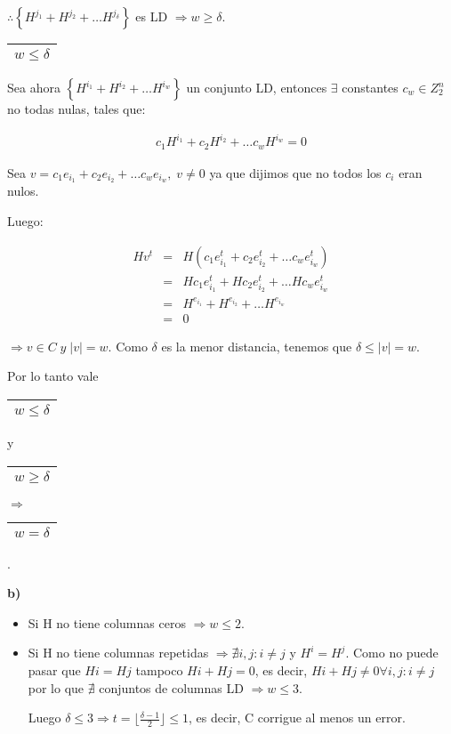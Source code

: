 \documentclass[12pt,a4paper]{report}
\newcounter{neq}
\begin{document}
		$\therefore \left\lbrace H^{j_{1}} + H^{j_{2}} + \dotsc H^{j_{\delta}} \right\rbrace$ es LD $\Rightarrow w \geq \delta$.

		\vspace{3mm}
		\begin{tabular}{|c|} \hline $w \leq \delta $ \\ \hline \end{tabular} Sea ahora $\left\lbrace H^{i_{1}} + H^{i_{2}} + \dotsc H^{i_{w}} \right\rbrace$ un conjunto LD, entonces $\exists$ constantes $c_{w} \in Z_{2}^{n}$ no todas nulas, tales que:

		\begin{eqnarray}
			\nonumber c_{1} H^{i_{1}} + c_{2} H^{i_{2}} + \dotsc c_{w} H^{i_{w}} = 0
		\end{eqnarray}

		Sea $v = c_{1} e_{i_{1}} + c_{2} e_{i_{2}} + \dotsc c_{w} e_{i_{w}} , \; v \neq 0$ ya que dijimos que no todos los $c_{i}$ eran nulos.

		Luego:

		\begin{eqnarray}
			\nonumber H v^{t} &=& H (c_{1} e_{i_{1}}^{t} + c_{2} e_{i_{2}}^{t} + \dotsc c_{w} e_{i_{w}}^{t}) \\
			\nonumber &=& H c_{1} e_{i_{1}}^{t} + H c_{2} e_{i_{2}}^{t} + \dotsc H c_{w} e_{i_{w}}^{t} \\
			\nonumber &=& H^{e_{i_{1}}} + H^{e_{i_{2}}} + \dotsc H^{e_{i_{w}}} \\
			\nonumber &=& 0
		\end{eqnarray}

		$\Rightarrow v \in C \; y \; \lvert v \rvert = w$. Como $\delta$ es la menor distancia, tenemos que $\delta \leq \lvert v \rvert = w$.

		\vspace{5mm}
		Por lo tanto vale \begin{tabular}{|c|} \hline $w \leq \delta $ \\ \hline \end{tabular} y \begin{tabular}{|c|} \hline $w \geq \delta $ \\ \hline \end{tabular} $\Rightarrow$ \begin{tabular}{|c|} \hline $w = \delta $ \\ \hline \end{tabular}.

		\vspace{5mm}
		\textbf{b)}
		\begin{itemize}
			\item Si H no tiene columnas ceros $\Rightarrow w \leq 2$.
			\item Si H no tiene columnas repetidas $\Rightarrow \nexists i,j : i \neq j$ y $H^{i} = H^{j}$. Como no puede pasar que $H{i} = H{j}$ tampoco $H{i} + H{j} = 0$, es decir, $H{i} + H{j} \neq 0 \forall i,j : i \neq j$ por lo que $\nexists$ conjuntos de columnas LD $\Rightarrow w \leq 3$.

			Luego $\delta \leq 3 \Rightarrow t = \lfloor \frac{\delta-1}{2} \rfloor \leq 1$, es decir, C corrigue al menos un error.
		\end{itemize}
\end{document}
